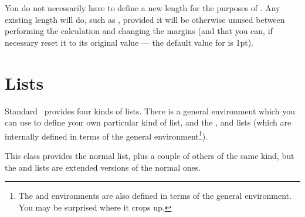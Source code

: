    You do not necessarily have to define a new length for the purposes
of \cmd{\calccentering}. Any existing length will do, such as
\lnc{\unitlength}, provided it will be otherwise unused between performing
the calculation and changing the margins (and that you can, 
if necessary reset it to its original value --- the default value for 
\lnc{\unitlength} is 1pt). 

\section{Lists}


    Standard \ltx\ provides four kinds of lists. There is a general 
environment which you can use to define your own particular kind of list,
and the ,  and  lists (which are 
internally defined in terms of the general  
environment\footnote{The  and  environments are also
defined in terms of the general  environment. You may be 
surprised where it crops up.}).


    This class provides the normal  list, plus a couple of others 
of the same kind, but the  
and  lists are extended versions of the normal ones.

